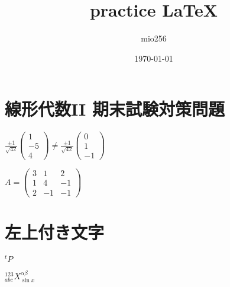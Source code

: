 \documentclass[a4paper,11pt]{jsarticle}
\begin{document}
\title{practice \LaTeX}
\author{mio256}
\date{\today}
\maketitle

\section{線形代数II 期末試験対策問題}

$\frac{\pm1}{\sqrt{42}}
  \left(\begin{matrix}
    1\\
    -5\\
    4
  \end{matrix}\right)
  \neq
  \frac{\pm1}{\sqrt{42}}
  \left(\begin{matrix}
    0\\
    1\\
    -1
  \end{matrix}\right)$

$A=\left(\begin{matrix}
    3&1&2\\
    1&4&-1\\
    2&-1&-1
  \end{matrix}\right)$

\section{左上付き文字}

$^{t}P$

$^{123}_{abc}X^{\alpha\beta}_{\sin{x}}$
\end{document}
